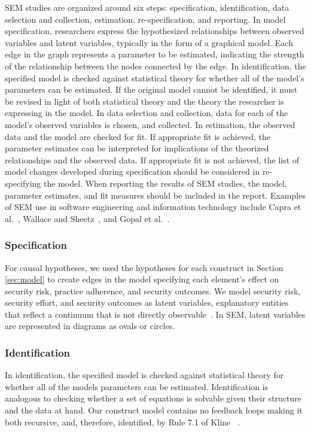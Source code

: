 SEM studies are organized around six steps: specification, identification, data selection and collection, estimation, re-specification, and reporting. In model specification, researchers express the hypothesized relationships between observed variables and latent variables, typically in the form of a graphical model. Each edge in the graph represents a parameter to be estimated, indicating the strength of the relationship between the nodes connected by the edge. In identification, the specified model is checked against statistical theory for whether all of the model’s parameters can be estimated. If the original model cannot be identified, it must be revised in light of both statistical theory and the theory the researcher is expressing in the model. In data selection and collection, data for each of the model’s observed variables is chosen, and collected. In estimation, the observed data and the model are checked for fit.  If appropriate fit is achieved, the parameter estimates can be interpreted for implications of the theorized relationships and the observed data. If appropriate fit is not achieved, the list of model changes developed during specification should be considered in re-specifying the model.  When reporting the results of SEM studies, the model, parameter estimates, and fit measures should be included in the report.
Examples of SEM use in software engineering and information technology include Capra et al.~\cite{capra2008empirical}, Wallace and Sheetz~\cite{wallace2014adoption}, and Gopal et al.~\cite{gopal2005impact}.

\subsubsection{Specification}
For causal hypotheses, we used the hypotheses for each construct in Section \ref{sec:model} to create edges in the model specifying each element’s effect on security risk, practice adherence, and security outcomes.  We model security risk, security effort, and security outcomes as latent variables, explanatory entities that reflect a continuum that is not directly observable~\cite{kline2015principles}. In SEM, latent variables are represented in diagrams as ovals or circles.

\subsubsection{Identification}
In identification, the specified model is checked against statistical theory for whether all of the models parameters can be estimated. Identification is analogous to checking whether a set of equations is solvable given their structure and the data at hand.  Our construct model contains no feedback loops making it both recursive, and, therefore, identified, by Rule 7.1 of Kline ~\cite{kline2015principles}.  

